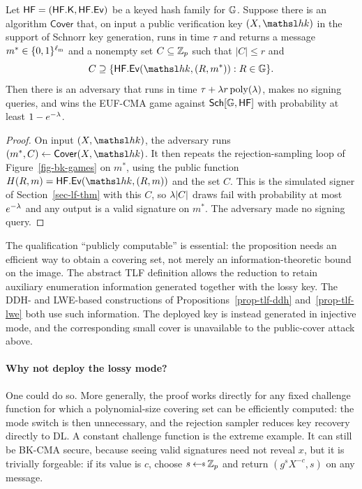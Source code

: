 \begin{proposition} \label{prop-lossy-forge}
Let $\mathsf{HF}=(\mathsf{HF}.\mathsf{K},\mathsf{HF}.\mathsf{Ev})$ be a keyed hash family for $\mathbb{G}$. Suppose there is an
algorithm $\mathsf{Cover}$ that, on input a public verification key
$(X,\hk)$ in the support of Schnorr key generation, runs in time $\tau$ and
returns a message $m^*\in\{0,1\}^{\ell_{\mathrm{m}}}$ and a nonempty set
$C\subseteq\mathbb Z_p$ such that $|C|\le r$ and
$$
C\supseteq\{\HFEv(\hk,(R,m^*)):R\in\GG\}.
$$
Then there is an adversary that runs in time
$\tau+\lambda r\mathop{\rm poly}\nolimits(\lambda)$, makes no signing queries, and wins the EUF-CMA game
against $\mathsf{Sch}[\mathbb{G},\mathsf{HF}]$ with probability at least $1-e^{-\lambda}$.
\end{proposition}

\begin{proof}
On input $(X,\hk)$, the adversary runs
$(m^*,C)\gets\mathsf{Cover}(X,\hk)$. It then repeats the rejection-sampling loop
of Figure~\ref{fig-bk-games} on $m^*$, using the public function
$H(R,m)=\HFEv(\hk,(R,m))$ and the set $C$. This is the simulated signer of
Section~\ref{sec-lf-thm} with this $C$, so $\lambda|C|$ draws fail with
probability at most $e^{-\lambda}$ and any output is a valid signature on $m^*$.
The adversary made no signing query.
\end{proof}

The qualification ``publicly computable'' is essential: the proposition needs
an efficient way to obtain a covering set, not merely an information-theoretic
bound on the image. The abstract TLF definition allows the reduction to retain
auxiliary enumeration information generated together with the lossy key. The
DDH- and LWE-based constructions of Propositions~\ref{prop-tlf-ddh}
and~\ref{prop-tlf-lwe} both use such information. The deployed key is instead
generated in injective mode, and the corresponding small cover is unavailable
to the public-cover attack above.

\paragraph*{Why not deploy the lossy mode?}
One could do so. More generally, the proof works directly for any fixed
challenge function for which a polynomial-size covering set can be efficiently
computed: the mode switch is then unnecessary, and the rejection sampler
reduces key recovery directly to DL. A constant challenge function is the
extreme example. It can still be BK-CMA secure, because seeing valid signatures
need not reveal $x$, but it is trivially forgeable: if its value is $c$, choose
$s\getsr\Zp$ and return $(g^sX^{-c},s)$ on any message.


